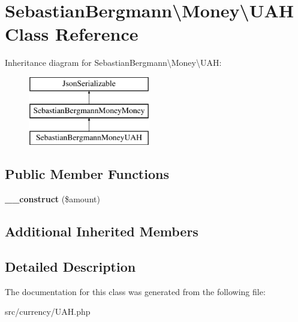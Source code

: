 \hypertarget{classSebastianBergmann_1_1Money_1_1UAH}{}\section{Sebastian\+Bergmann\textbackslash{}Money\textbackslash{}U\+A\+H Class Reference}
\label{classSebastianBergmann_1_1Money_1_1UAH}
Inheritance diagram for Sebastian\+Bergmann\textbackslash{}Money\textbackslash{}U\+A\+H\+:\begin{figure}[H]
\begin{center}
\leavevmode
\includegraphics[height=3.000000cm]{classSebastianBergmann_1_1Money_1_1UAH}
\end{center}
\end{figure}
\subsection*{Public Member Functions}
\begin{DoxyCompactItemize}
\item 
\hypertarget{classSebastianBergmann_1_1Money_1_1UAH_a5430c35161a547eb046714a520402cf2}{}{\bfseries \+\_\+\+\_\+construct} (\$amount)\label{classSebastianBergmann_1_1Money_1_1UAH_a5430c35161a547eb046714a520402cf2}

\end{DoxyCompactItemize}
\subsection*{Additional Inherited Members}


\subsection{Detailed Description}


The documentation for this class was generated from the following file\+:\begin{DoxyCompactItemize}
\item 
src/currency/U\+A\+H.\+php\end{DoxyCompactItemize}

